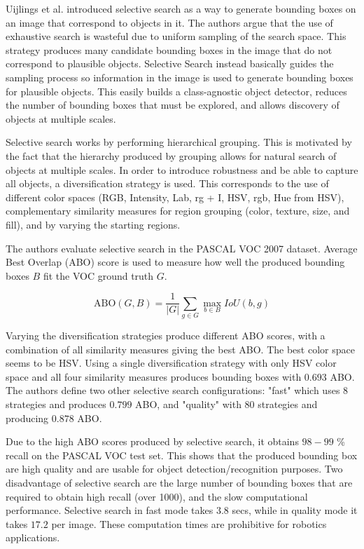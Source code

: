 Uijlings et al. \cite{uijlings2013selective} introduced selective search as a way to generate bounding boxes on an image that correspond to objects in it. The authors argue that the use of exhaustive search is wasteful due to uniform sampling of the search space. This strategy produces many candidate bounding boxes in the image that do not correspond to plausible objects. Selective Search instead basically guides the sampling process so information in the image is used to generate bounding boxes for plausible objects. This easily builds a class-agnostic object detector, reduces the number of bounding boxes that must be explored, and allows discovery of objects at multiple scales.

Selective search works by performing hierarchical grouping. This is motivated by the fact that the hierarchy produced by grouping allows for natural search of objects at multiple scales. In order to introduce robustness and be able to capture all objects, a diversification strategy is used. This corresponds to the use of different color spaces (RGB, Intensity, Lab, rg + I, HSV, rgb, Hue from HSV), complementary similarity measures for region grouping (color, texture, size, and fill), and by varying the starting regions.

The authors evaluate selective search in the PASCAL VOC 2007 dataset. Average Best Overlap (ABO) score is used to measure how well the produced bounding boxes $B$ fit the VOC ground truth $G$.

\begin{equation}
	\text{ABO}(G, B) = \frac{1}{|G|} \sum_{g \in G} \max_{b \in B} IoU(b, g)
\end{equation}

Varying the diversification strategies produce different ABO scores, with a combination of all similarity measures giving the best ABO. The best color space seems to be HSV. Using a single diversification strategy with only HSV color space and all four similarity measures produces bounding boxes with $0.693$ ABO. The authors define two other selective search configurations: "fast" which uses 8 strategies and produces $0.799$ ABO, and "quality" with 80 strategies and producing $0.878$ ABO.

Due to the high ABO scores produced by selective search, it obtains $98-99$ \% recall on the PASCAL VOC test set. This shows that the produced bounding box are high quality and are usable for object detection/recognition purposes.
Two disadvantage of selective search are the large number of bounding boxes that are required to obtain high recall (over 1000), and the slow computational performance. Selective search in fast mode takes $3.8$ secs, while in quality mode it takes $17.2$ per image. These computation times are prohibitive for robotics applications.

